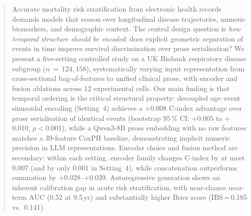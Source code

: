 \begin{abstract}
Accurate mortality risk stratification from electronic health records demands
models that reason over longitudinal disease trajectories, numeric biomarkers,
and demographic context.
The central design question is \emph{how temporal structure should be encoded}:
does explicit geometric separation of events in time improve survival
discrimination over prose serialisation?
We present a five-setting controlled study on a UK Biobank respiratory disease
subgroup ($n\,{=}\,124{,}158$), systematically varying input representation
from cross-sectional bag-of-features to unified clinical prose, with encoder
and fusion ablations across 12 experimental cells.
Our main finding is that temporal ordering is the critical structural property:
decoupled age--event sinusoidal encoding (Setting~4) achieves a $+$0.008
C-index advantage over prose serialisation of identical events (bootstrap
95\,\% CI: $+$0.005 to $+$0.010, $p<0.001$), while a Qwen3-8B prose
embedding with no raw features matches a 39-feature CoxPH baseline,
demonstrating implicit numeric precision in LLM representations.
Encoder choice and fusion method are secondary: within each setting, encoder
family changes C-index by at most 0.007 (and by only 0.001 in Setting~4),
while concatenation outperforms summation by $+$0.028--$+$0.039.
Autoregressive generation shows an inherent calibration gap in acute risk
stratification, with near-chance near-term AUC (0.52 at 9.5\,yr) and
substantially higher Brier score (IBS\,=\,0.185 vs.\ 0.141).
\end{abstract}
